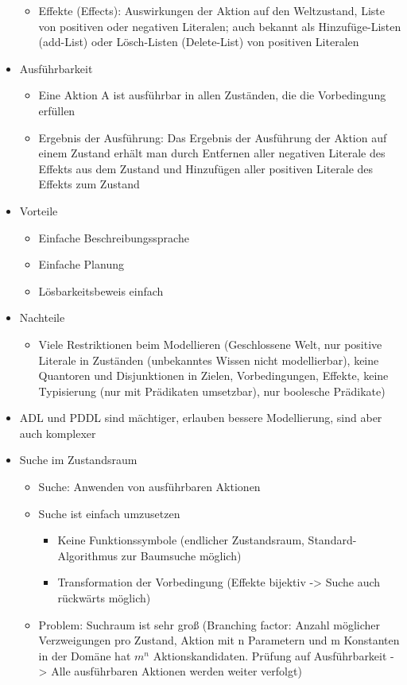 \documentclass[paper=a4, fontsize=11pt]{scrartcl} %
\numberwithin{equation}{section} %
\numberwithin{figure}{section} %
\numberwithin{table}{section} %
\begin{document}
\begin{itemize}
\begin{itemize}
\item Effekte (Effects): Auswirkungen der Aktion auf den Weltzustand, Liste von positiven oder negativen Literalen; auch bekannt als Hinzufüge-Listen (add-List) oder Lösch-Listen (Delete-List) von positiven Literalen
\end{itemize}
\item Ausführbarkeit
\begin{itemize}
\item Eine Aktion A ist ausführbar in allen Zuständen, die die Vorbedingung erfüllen
\item Ergebnis der Ausführung: Das Ergebnis der Ausführung der Aktion auf einem Zustand erhält man durch Entfernen aller negativen Literale des Effekts aus dem Zustand und Hinzufügen aller positiven Literale des Effekts zum Zustand
\end{itemize}
\item Vorteile
\begin{itemize}
\item Einfache Beschreibungssprache
\item Einfache Planung
\item Lösbarkeitsbeweis einfach
\end{itemize}
\item Nachteile
\begin{itemize}
\item Viele Restriktionen beim Modellieren (Geschlossene Welt, nur positive Literale in Zuständen (unbekanntes Wissen nicht modellierbar), keine Quantoren und Disjunktionen in Zielen, Vorbedingungen, Effekte, keine Typisierung (nur mit Prädikaten umsetzbar), nur boolesche Prädikate)
\end{itemize}
\item ADL und PDDL sind mächtiger, erlauben bessere Modellierung, sind aber auch komplexer
\item Suche im Zustandsraum
\begin{itemize}
\item Suche: Anwenden von ausführbaren Aktionen
\item Suche ist einfach umzusetzen
\begin{itemize}
\item Keine Funktionssymbole (endlicher Zustandsraum, Standard-Algorithmus zur Baumsuche möglich)
\item Transformation der Vorbedingung (Effekte bijektiv -> Suche auch rückwärts möglich)
\end{itemize}
\item Problem: Suchraum ist sehr groß (Branching factor: Anzahl möglicher Verzweigungen pro Zustand, Aktion mit n Parametern und m Konstanten in der Domäne hat $m^n$ Aktionskandidaten. Prüfung auf Ausführbarkeit -> Alle ausführbaren Aktionen werden weiter verfolgt)

\end{itemize}
\end{itemize}
\end{document}
